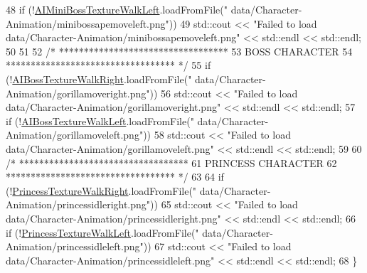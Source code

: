 \begin{DoxyCode}
48     \textcolor{keywordflow}{if} (!\hyperlink{classAnimation_a9664ca5d22db69c2cc835b49ec8383bc}{AIMiniBossTextureWalkLeft}.loadFromFile(\textcolor{stringliteral}{"
      data/Character-Animation/minibossapemoveleft.png"}))
49         std::cout << \textcolor{stringliteral}{"Failed to load data/Character-Animation/minibossapemoveleft.png"} << std::endl << 
      std::endl;
50 
51 
52     \textcolor{comment}{/* **********************************}
53 \textcolor{comment}{                BOSS CHARACTER}
54 \textcolor{comment}{     ********************************** */}
55     \textcolor{keywordflow}{if} (!\hyperlink{classAnimation_a2de9d819490c4799986cda87f8c9f498}{AIBossTextureWalkRight}.loadFromFile(\textcolor{stringliteral}{"
      data/Character-Animation/gorillamoveright.png"}))
56         std::cout << \textcolor{stringliteral}{"Failed to load data/Character-Animation/gorillamoveright.png"} << std::endl << 
      std::endl;
57     \textcolor{keywordflow}{if} (!\hyperlink{classAnimation_ac4e77ff7823c13967563c9f818ca1a9e}{AIBossTextureWalkLeft}.loadFromFile(\textcolor{stringliteral}{"
      data/Character-Animation/gorillamoveleft.png"}))
58         std::cout << \textcolor{stringliteral}{"Failed to load data/Character-Animation/gorillamoveleft.png"} << std::endl << 
      std::endl;
59 
60     \textcolor{comment}{/* **********************************}
61 \textcolor{comment}{                PRINCESS CHARACTER}
62 \textcolor{comment}{     ********************************** */}
63 
64     \textcolor{keywordflow}{if} (!\hyperlink{classAnimation_ab77fb25df92b7ad25ffb925763cb650d}{PrincessTextureWalkRight}.loadFromFile(\textcolor{stringliteral}{"
      data/Character-Animation/princessidleright.png"}))
65         std::cout << \textcolor{stringliteral}{"Failed to load data/Character-Animation/princessidleright.png"} << std::endl << 
      std::endl;
66     \textcolor{keywordflow}{if} (!\hyperlink{classAnimation_abfb9fab906ea1a5c9fbd0195bc1e0e5f}{PrincessTextureWalkLeft}.loadFromFile(\textcolor{stringliteral}{"
      data/Character-Animation/princessidleleft.png"}))
67         std::cout << \textcolor{stringliteral}{"Failed to load data/Character-Animation/princessidleleft.png"} << std::endl << 
      std::endl;
68 \}
\end{DoxyCode}
